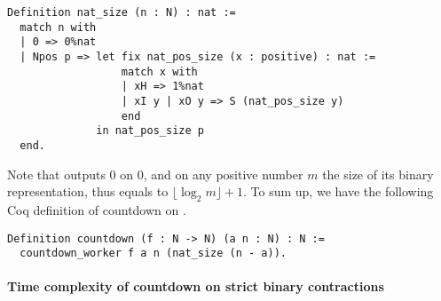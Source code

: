\begin{lstlisting}
Definition nat_size (n : N) : nat :=
  match n with
  | 0 => 0%nat
  | Npos p => let fix nat_pos_size (x : positive) : nat :=
                  match x with
                  | xH => 1%nat
                  | xI y | xO y => S (nat_pos_size y) 
                  end
              in nat_pos_size p
  end.
\end{lstlisting}
Note that  outputs $0$ on $0$, and on any positive number $m$ the size of its binary representation, thus equals to $\lfloor \log_{2} m \rfloor + 1$. To sum up, we have the following Coq definition of countdown on .

\begin{lstlisting}
Definition countdown (f : N -> N) (a n : N) : N := 
  countdown_worker f a n (nat_size (n - a)).
\end{lstlisting}

\paragraph*{Time complexity of countdown on strict binary contractions}

